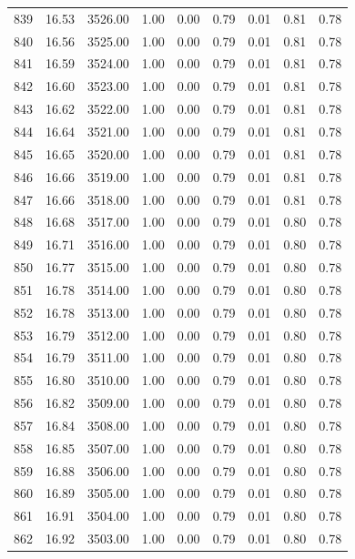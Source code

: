 \documentclass{article}\usepackage[]{graphicx}\usepackage[]{color}
\begin{document}
\begin{longtable}{rrrrrrrrr}
  839 & 16.53 & 3526.00 & 1.00 & 0.00 & 0.79 & 0.01 & 0.81 & 0.78 \\ 
  840 & 16.56 & 3525.00 & 1.00 & 0.00 & 0.79 & 0.01 & 0.81 & 0.78 \\ 
  841 & 16.59 & 3524.00 & 1.00 & 0.00 & 0.79 & 0.01 & 0.81 & 0.78 \\ 
  842 & 16.60 & 3523.00 & 1.00 & 0.00 & 0.79 & 0.01 & 0.81 & 0.78 \\ 
  843 & 16.62 & 3522.00 & 1.00 & 0.00 & 0.79 & 0.01 & 0.81 & 0.78 \\ 
  844 & 16.64 & 3521.00 & 1.00 & 0.00 & 0.79 & 0.01 & 0.81 & 0.78 \\ 
  845 & 16.65 & 3520.00 & 1.00 & 0.00 & 0.79 & 0.01 & 0.81 & 0.78 \\ 
  846 & 16.66 & 3519.00 & 1.00 & 0.00 & 0.79 & 0.01 & 0.81 & 0.78 \\ 
  847 & 16.66 & 3518.00 & 1.00 & 0.00 & 0.79 & 0.01 & 0.81 & 0.78 \\ 
  848 & 16.68 & 3517.00 & 1.00 & 0.00 & 0.79 & 0.01 & 0.80 & 0.78 \\ 
  849 & 16.71 & 3516.00 & 1.00 & 0.00 & 0.79 & 0.01 & 0.80 & 0.78 \\ 
  850 & 16.77 & 3515.00 & 1.00 & 0.00 & 0.79 & 0.01 & 0.80 & 0.78 \\ 
  851 & 16.78 & 3514.00 & 1.00 & 0.00 & 0.79 & 0.01 & 0.80 & 0.78 \\ 
  852 & 16.78 & 3513.00 & 1.00 & 0.00 & 0.79 & 0.01 & 0.80 & 0.78 \\ 
  853 & 16.79 & 3512.00 & 1.00 & 0.00 & 0.79 & 0.01 & 0.80 & 0.78 \\ 
  854 & 16.79 & 3511.00 & 1.00 & 0.00 & 0.79 & 0.01 & 0.80 & 0.78 \\ 
  855 & 16.80 & 3510.00 & 1.00 & 0.00 & 0.79 & 0.01 & 0.80 & 0.78 \\ 
  856 & 16.82 & 3509.00 & 1.00 & 0.00 & 0.79 & 0.01 & 0.80 & 0.78 \\ 
  857 & 16.84 & 3508.00 & 1.00 & 0.00 & 0.79 & 0.01 & 0.80 & 0.78 \\ 
  858 & 16.85 & 3507.00 & 1.00 & 0.00 & 0.79 & 0.01 & 0.80 & 0.78 \\ 
  859 & 16.88 & 3506.00 & 1.00 & 0.00 & 0.79 & 0.01 & 0.80 & 0.78 \\ 
  860 & 16.89 & 3505.00 & 1.00 & 0.00 & 0.79 & 0.01 & 0.80 & 0.78 \\ 
  861 & 16.91 & 3504.00 & 1.00 & 0.00 & 0.79 & 0.01 & 0.80 & 0.78 \\ 
  862 & 16.92 & 3503.00 & 1.00 & 0.00 & 0.79 & 0.01 & 0.80 & 0.78 \\ 

\end{longtable}
\end{document}
